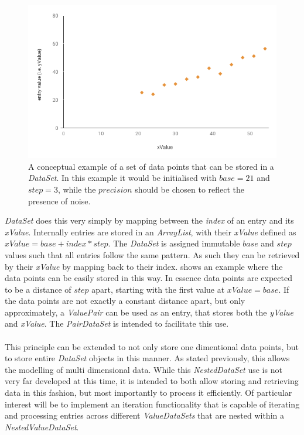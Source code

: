 \documentclass[main.tex]{subfiles}
\begin{document}
      \begin{figure}[h]
        \centering
        \includegraphics[width=0.75\linewidth]{figures/dataSetGraph}
        \caption{A conceptual example of a set of data points that can be stored in a \textit{DataSet}. In this example it would be initialised with $base=21$ and $step=3$, while the $precision$ should be chosen to reflect the presence of noise.}
        \label{fig:dataSetGraph}
      \end{figure}
    
      \textit{DataSet} does this very simply by mapping between the \textit{index} of an entry and its \textit{xValue}. Internally entries are stored in an \textit{ArrayList}, with their \textit{xValue} defined as $xValue= base + index * step$. The \textit{DataSet} is assigned immutable $base$ and $step$ values such that all entries follow the same pattern. As such they can be retrieved by their \textit{xValue} by mapping back to their index.  shows an example where the data points can be easily stored in this way. In essence data points are expected to be a distance of $step$ apart, starting with the first value at $xValue=base$. If the data points are not exactly a constant distance apart, but only approximately, a \textit{ValuePair} can be used as an entry, that stores both the \textit{yValue} and \textit{xValue}. The \textit{PairDataSet} is intended to facilitate this use.
      \\\\
      This principle can be extended to not only store one dimentional data points, but to store entire \textit{DataSet} objects in this manner. As stated previously, this allows the modelling of multi dimensional data. While this \textit{NestedDataSet} use is not very far developed at this time, it is intended to both allow storing and retrieving data in this fashion, but most importantly to process it efficiently. Of particular interest will be to implement an iteration functionality that is capable of iterating and processing entries across different \textit{ValueDataSets} that are nested within a \textit{NestedValueDataSet}.
      
\end{document}
